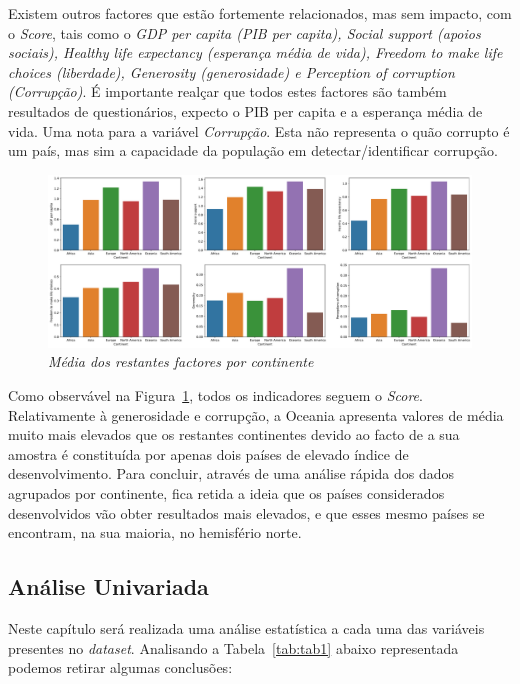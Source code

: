 \documentclass[12pt, a4paper]{article}
\begin{document}
Existem outros factores que estão fortemente relacionados, mas sem
impacto, com o \emph{Score}, tais como o \emph{GDP per capita (PIB per
capita), Social support (apoios sociais), Healthy life expectancy
(esperança média de vida), Freedom to make life choices (liberdade),
Generosity (generosidade) e Perception of corruption (Corrupção)}. É
importante realçar que todos estes factores são também resultados de
questionários, expecto o PIB per capita e a esperança média de
vida. Uma nota para a variável
\emph{Corrupção}. Esta não representa o quão corrupto é um país, mas sim
a capacidade da população em detectar/identificar corrupção.

\begin{figure}[h]
\includegraphics[scale=0.30]{variables-continents.pdf}
\centering
\caption{\emph{Média dos restantes factores por continente}}
\label{fig:fig3}
\end{figure}

Como observável na Figura~\ref{fig:fig3}, todos os indicadores seguem o \emph{Score}. Relativamente
à generosidade e corrupção, a Oceania apresenta valores de média muito
mais elevados que os restantes continentes devido ao facto de a sua
amostra é constituída por apenas dois países de elevado índice de
desenvolvimento. Para concluir, através de
uma análise rápida dos dados agrupados por continente, fica retida a
ideia que os países considerados desenvolvidos vão obter resultados mais
elevados, e que esses mesmo países se encontram, na sua maioria, no
hemisfério norte.




\subsection{Análise Univariada} %
\label{sub:análise_univariada}


Neste capítulo será realizada uma análise estatística a cada uma das
variáveis presentes no \emph{dataset}. Analisando a Tabela~\ref{tab:tab1} abaixo
representada podemos retirar algumas conclusões:
\end{document}
